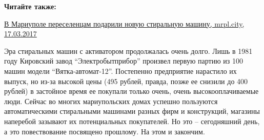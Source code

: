 \begin{minipage}{0.9\textwidth}
\textbf{Читайте также:} 

\href{https://mrpl.city/news/view/mariupol-podaril-pereselentsam-novuyu-stiralnuyu-mashinu}{%
В Мариуполе переселенцам подарили новую стиральную машину, mrpl.city, 17.03.2017}
\end{minipage}

Эра стиральных машин с активатором продолжалась очень долго. Лишь в 1981 году
Кировский завод \enquote{Электробытприбор} произвел первую партию из 100 машин модели
\enquote{Вятка-автомат-12}. Постепенно предприятие нарастило их выпуск, но из-за
высокой цены (495 рублей, правда, позже ее снизили до 400 рублей) в застойное
время ее покупали только очень, очень высокооплачиваемые люди. Сейчас во многих
мариупольских домах успешно пользуются автоматическими стиральными машинами
разных фирм и конструкций, магазины наперебой зазывают их потенциальных
покупателей. Но это – сегодняшний день, а это повествование посвящено прошлому.
На этом и закончим.
